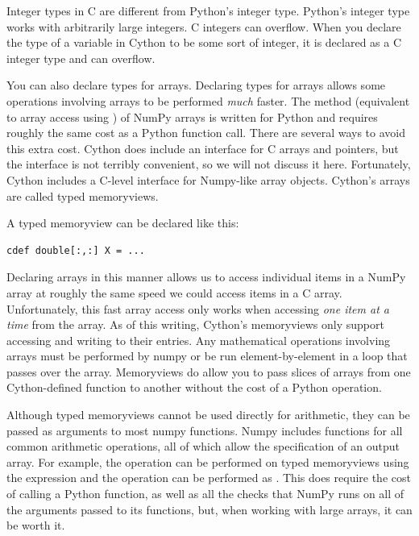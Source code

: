 \begin{warn}
Integer types in C are different from Python's integer type.
Python's integer type works with arbitrarily large integers.
C integers can overflow.
When you declare the type of a variable in Cython to be some sort of integer, it is declared as a C integer type and can overflow.
\end{warn} 

You can also declare types for arrays.
Declaring types for arrays allows some operations involving arrays to be performed \emph{much} faster.
The  method (equivalent to array access using \li{[ ]}) of NumPy arrays is written for Python and requires roughly the same cost as a Python function call.
There are several ways to avoid this extra cost.
Cython does include an interface for C arrays and pointers, but the interface is not terribly convenient, so we will not discuss it here.
Fortunately, Cython includes a C-level interface for Numpy-like array objects.
Cython's arrays are called typed memoryviews.

A typed memoryview can be declared like this:
\begin{lstlisting}
cdef double[:,:] X = ...
\end{lstlisting}
Declaring arrays in this manner allows us to access individual items in a NumPy array at roughly the same speed we could access items in a C array.
Unfortunately, this fast array access only works when accessing \textit{one item at a time} from the array.
As of this writing, Cython's memoryviews only support accessing and writing to their entries.
Any mathematical operations involving arrays must be performed by numpy or be run element-by-element in a loop that passes over the array.
Memoryviews do allow you to pass slices of arrays from one Cython-defined function to another without the cost of a Python operation.

\begin{info}
Although typed memoryviews cannot be used directly for arithmetic, they can be passed as arguments to most numpy functions.
Numpy includes functions for all common arithmetic operations, all of which allow the specification of an output array.
For example, the operation  can be performed on typed memoryviews using the expression  and the operation  can be performed as .
This does require the cost of calling a Python function, as well as all the checks that NumPy runs on all of the arguments passed to its functions, but, when working with large arrays, it can be worth it.
\end{info}

